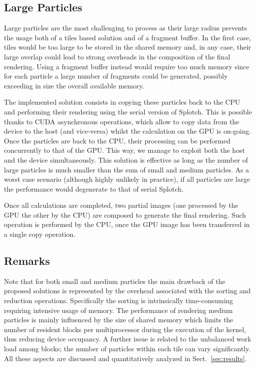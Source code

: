 \documentclass[preprint,5pt]{elsarticle}
\begin{document}
\subsection{Large Particles}
\label{sec:largeparticles}
Large particles are the most challenging to process as their large
radius prevents the usage both of a tiles based solution and of a fragment buffer.
In the first case, tiles would be too large to be stored in the shared memory
and, in any case, their large overlap could lead to strong overheads in the composition of the
final rendering. Using a fragment buffer instead would require too much memory since
for each particle a large number of fragments could be generated, possibly
exceeding in size the overall available memory.

The implemented solution consists in copying these particles back to the CPU and performing their rendering
using the serial version of Splotch. This is possible thanks to CUDA asynchronous
operations, which allow to copy data from the device to the host (and vice-versa)
whilst the calculation on the GPU is on-going. Once the particles are back to the CPU,
their processing can be performed concurrently to that of the GPU.  
This way, we manage to exploit both the host and the device simultaneously.
This solution is effective as long as the number of large particles
is much smaller than the sum of small and medium particles. As a worst case scenario (although highly unlikely in practice), if all particles are large the performance would degenerate to that of serial Splotch.

Once all calculations are completed, two partial images (one processed by the GPU the other by the CPU) are composed to generate the final rendering. Such operation is performed by the CPU, once the GPU image has been transferred in a single copy operation. 

\subsection{Remarks}
Note that for both small and medium particles the main drawback of the proposed solutions
is represented by the overhead associated with the sorting and reduction operations. Specifically the sorting is intrinsically time-consuming requiring intensive usage of memory.
The performance of rendering medium particles is mainly influenced
by the size of shared memory which limits the number of resident blocks
per multiprocessor during the execution of the kernel, thus reducing device occupancy. 
A further issue is related to the unbalanced work load among blocks; the number of particles within each tile can vary significantly. All these aspects are discussed and quantitatively analyzed in Sect.~\ref{sec:results}.
\end{document}
